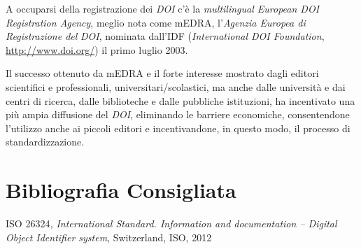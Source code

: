 A occuparsi della registrazione dei \emph{DOI} c'è la \emph{multilingual
European DOI Registration Agency}, meglio nota come mEDRA,
l'\emph{Agenzia Europea di Registrazione del} \emph{DOI}, nominata
dall'IDF (\emph{International DOI Foundation},
\url{http://www.doi.org/}) il primo luglio 2003.

Il successo ottenuto da mEDRA e il forte interesse mostrato dagli
editori scientifici e professionali, universitari/scolastici, ma anche
dalle università e dai centri di ricerca, dalle biblioteche e dalle
pubbliche istituzioni, ha incentivato una più ampia diffusione del
\emph{DOI}, eliminando le barriere economiche, consentendone l'utilizzo
anche ai piccoli editori e incentivandone, in questo modo, il processo
di standardizzazione.

\section*{Bibliografia Consigliata}
{\parindent0pt 
ISO 26324\emph{,} \emph{International Standard. Information and
documentation -- Digital Object Identifier system}, Switzerland, ISO,
2012
}

